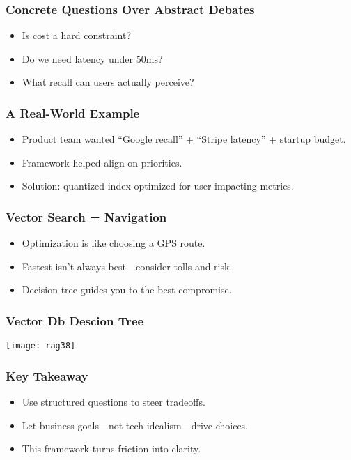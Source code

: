 \begin{frame}[fragile]\frametitle{Concrete Questions Over Abstract Debates}
\begin{itemize}
    \item Is cost a hard constraint?
    \item Do we need latency under 50ms?
    \item What recall can users actually perceive?
\end{itemize}
\end{frame}

\begin{frame}[fragile]\frametitle{A Real-World Example}
\begin{itemize}
    \item Product team wanted ``Google recall'' + ``Stripe latency'' + startup budget.
    \item Framework helped align on priorities.
    \item Solution: quantized index optimized for user-impacting metrics.
\end{itemize}
\end{frame}

\begin{frame}[fragile]\frametitle{Vector Search = Navigation}
\begin{itemize}
    \item Optimization is like choosing a GPS route.
    \item Fastest isn’t always best—consider tolls and risk.
    \item Decision tree guides you to the best compromise.
\end{itemize}
\end{frame}

\begin{frame}[fragile]\frametitle{Vector Db Descion Tree}
		\begin{center}
		\texttt{[image: rag38]}
		\end{center}
\end{frame}

\begin{frame}[fragile]\frametitle{Key Takeaway}
\begin{itemize}
    \item Use structured questions to steer tradeoffs.
    \item Let business goals—not tech idealism—drive choices.
    \item This framework turns friction into clarity.
\end{itemize}
\end{frame}

